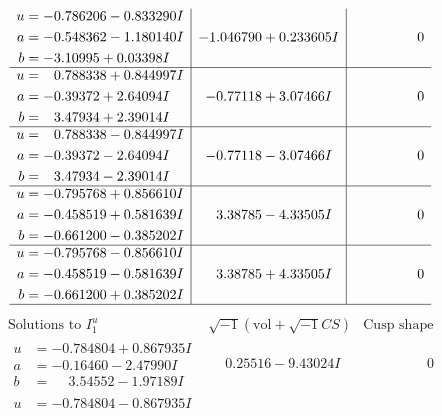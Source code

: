 \documentclass[1p]{elsarticle_modified}
\theoremstyle{definition}
\newcommand{\I}{\sqrt{-1}}
\begin{document}
$$\begin{array}{c|c|c}
\begin{aligned}
u &= -0.786206 - 0.833290 I \\
a &= -0.548362 - 1.180140 I \\
b &= -3.10995 + 0.03398 I\end{aligned}
 & -1.046790 + 0.233605 I & \phantom{-0.000000 } 0 \\ \hline\begin{aligned}
u &= \phantom{-}0.788338 + 0.844997 I \\
a &= -0.39372 + 2.64094 I \\
b &= \phantom{-}3.47934 + 2.39014 I\end{aligned}
 & -0.77118 + 3.07466 I & \phantom{-0.000000 } 0 \\ \hline\begin{aligned}
u &= \phantom{-}0.788338 - 0.844997 I \\
a &= -0.39372 - 2.64094 I \\
b &= \phantom{-}3.47934 - 2.39014 I\end{aligned}
 & -0.77118 - 3.07466 I & \phantom{-0.000000 } 0 \\ \hline\begin{aligned}
u &= -0.795768 + 0.856610 I \\
a &= -0.458519 + 0.581639 I \\
b &= -0.661200 - 0.385202 I\end{aligned}
 & \phantom{-}3.38785 - 4.33505 I & \phantom{-0.000000 } 0 \\ \hline\begin{aligned}
u &= -0.795768 - 0.856610 I \\
a &= -0.458519 - 0.581639 I \\
b &= -0.661200 + 0.385202 I\end{aligned}
 & \phantom{-}3.38785 + 4.33505 I & \phantom{-0.000000 } 0\\
 \hline 
 \end{array}$$\newpage$$\begin{array}{c|c|c}  
\text{Solutions to }I^u_{1}& \I (\text{vol} + \sqrt{-1}CS) & \text{Cusp shape}\\
 \hline 
\begin{aligned}
u &= -0.784804 + 0.867935 I \\
a &= -0.16460 - 2.47990 I \\
b &= \phantom{-}3.54552 - 1.97189 I\end{aligned}
 & \phantom{-}0.25516 - 9.43024 I & \phantom{-0.000000 } 0 \\ \hline\begin{aligned}
u &= -0.784804 - 0.867935 I \\

\end{aligned}
\end{array}$$
\end{document}

